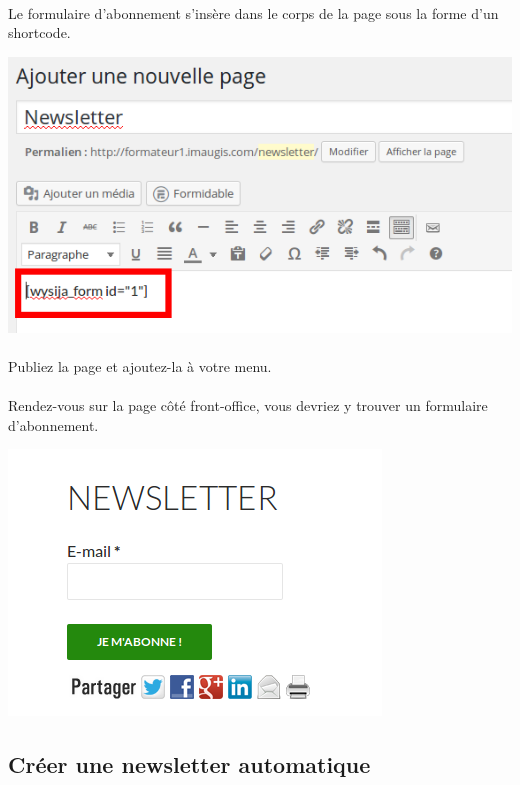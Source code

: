 \documentclass[10pt,a4paper]{article}
\begin{document}
\paragraph{}Le formulaire d'abonnement s'insère dans le corps de la page sous la forme d'un shortcode.
\begin{center}
\includegraphics[scale=0.3]{img/0212.png}
\end{center}
\paragraph{}Publiez la page et ajoutez-la à votre menu.
\paragraph{}Rendez-vous sur la page côté front-office, vous devriez y trouver un formulaire d'abonnement.
\begin{center}
\includegraphics[scale=0.3]{img/0213.png}
\end{center}
\subsection{Créer une newsletter automatique}
\end{document}
